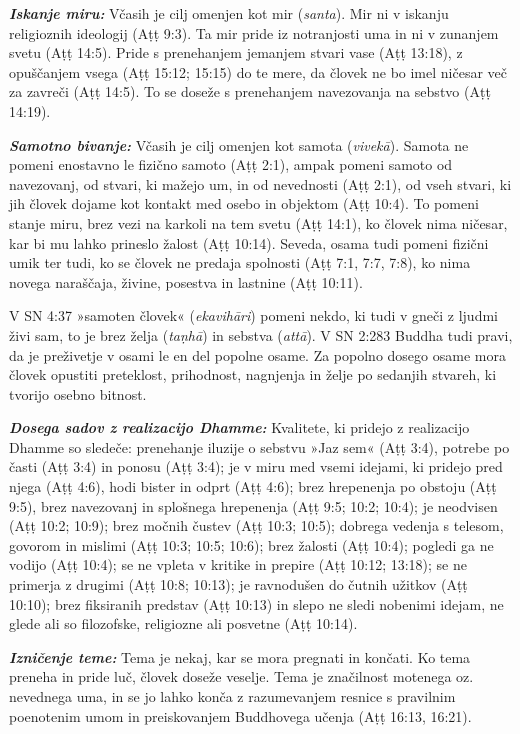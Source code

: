 \textbf{\emph{Iskanje miru:} }Včasih je cilj omenjen kot mir
(\emph{santa}). Mir ni v iskanju religioznih ideologij (Aṭṭ 9:3). Ta mir
pride iz notranjosti uma in ni v zunanjem svetu (Aṭṭ 14:5). Pride s
prenehanjem jemanjem stvari vase (Aṭṭ 13:18), z opuščanjem vsega (Aṭṭ
15:12; 15:15) do te mere, da človek ne bo imel ničesar več za zavreči
(Aṭṭ 14:5). To se doseže s prenehanjem navezovanja na sebstvo (Aṭṭ
14:19).

\textbf{\emph{Samotno bivanje:} }Včasih je cilj omenjen kot samota
(\emph{vivekā}). Samota ne pomeni enostavno le fizično samoto (Aṭṭ 2:1),
ampak pomeni samoto od navezovanj, od stvari, ki mažejo um, in od
nevednosti (Aṭṭ 2:1), od vseh stvari, ki jih človek dojame kot kontakt
med osebo in objektom (Aṭṭ 10:4). To pomeni stanje miru, brez vezi na
karkoli na tem svetu (Aṭṭ 14:1), ko človek nima ničesar, kar bi mu lahko
prineslo žalost (Aṭṭ 10:14). Seveda, osama tudi pomeni fizični umik ter
tudi, ko se človek ne predaja spolnosti (Aṭṭ 7:1, 7:7, 7:8), ko nima
novega naraščaja, živine, posestva in lastnine (Aṭṭ 10:11).

V SN 4:37 »samoten človek« (\emph{ekavihāri}) pomeni nekdo, ki tudi v
gneči z ljudmi živi sam, to je brez želja (\emph{taṇhā}) in sebstva
(\emph{attā}). V SN 2:283 Buddha tudi pravi, da je preživetje v osami le
en del popolne osame. Za popolno dosego osame mora človek opustiti
preteklost, prihodnost, nagnjenja in želje po sedanjih stvareh, ki
tvorijo osebno bitnost.

\textbf{\emph{Dosega sadov z realizacijo Dhamme:} }Kvalitete, ki pridejo
z realizacijo Dhamme so sledeče: prenehanje iluzije o sebstvu »Jaz sem«
(Aṭṭ 3:4), potrebe po časti (Aṭṭ 3:4) in ponosu (Aṭṭ 3:4); je v miru med
vsemi idejami, ki pridejo pred njega (Aṭṭ 4:6), hodi bister in odprt
(Aṭṭ 4:6); brez hrepenenja po obstoju (Aṭṭ 9:5), brez navezovanj in
splošnega hrepenenja (Aṭṭ 9:5; 10:2; 10:4); je neodvisen (Aṭṭ 10:2;
10:9); brez močnih čustev (Aṭṭ 10:3; 10:5); dobrega vedenja s telesom,
govorom in mislimi (Aṭṭ 10:3; 10:5; 10:6); brez žalosti (Aṭṭ 10:4);
pogledi ga ne vodijo (Aṭṭ 10:4); se ne vpleta v kritike in prepire (Aṭṭ
10:12; 13:18); se ne primerja z drugimi (Aṭṭ 10:8; 10:13); je ravnodušen
do čutnih užitkov (Aṭṭ 10:10); brez fiksiranih predstav (Aṭṭ 10:13) in
slepo ne sledi nobenimi idejam, ne glede ali so filozofske, religiozne
ali posvetne (Aṭṭ 10:14).

\textbf{\emph{Izničenje teme:} }Tema je nekaj, kar se mora pregnati in
končati. Ko tema preneha in pride luč, človek doseže veselje. Tema je
značilnost motenega oz. nevednega uma, in se jo lahko konča z
razumevanjem resnice s pravilnim poenotenim umom in preiskovanjem
Buddhovega učenja (Aṭṭ 16:13, 16:21).

